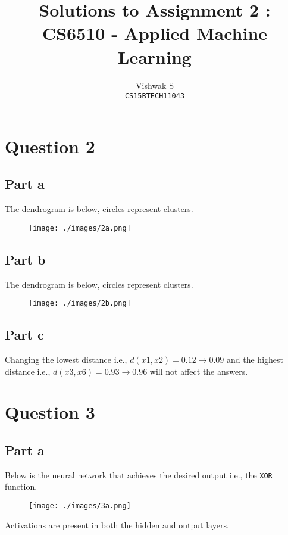 \documentclass{article}
\title{Solutions to Assignment 2 : CS6510 - Applied Machine Learning}
\author{Vishwak S\\
\texttt{CS15BTECH11043}}
\date{}
\begin{document}
\maketitle

\section*{Question 2}
\subsection*{Part a}
The dendrogram is below, circles represent clusters.
\begin{figure}[H]
\centering
\texttt{[image: ./images/2a.png]}
\end{figure}

\subsection*{Part b}
The dendrogram is below, circles represent clusters.
\begin{figure}[H]
\centering
\texttt{[image: ./images/2b.png]}
\end{figure}

\subsection*{Part c}
Changing the lowest distance i.e., \(d(x1, x2) = 0.12 \rightarrow 0.09\) and the highest distance i.e., \(d(x3, x6) = 0.93 \rightarrow 0.96\) will not affect the answers.

\section*{Question 3}
\subsection*{Part a}
\begin{flushleft}
Below is the neural network that achieves the desired output i.e., the \texttt{XOR} function. 
\begin{figure}[H]
\centering
\texttt{[image: ./images/3a.png]}
\end{figure}
Activations are present in both the hidden and output layers.
\end{flushleft}
\end{document}

